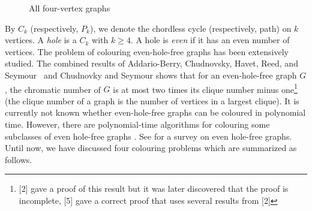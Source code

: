 \documentclass[12pt]{article}
\begin{document}
\begin{figure}
\begin{center}
		\end{center}
		\caption{All four-vertex graphs}\label{fig:4vertex-graphs}
	\end{figure}
	
	By $C_k$ (respectively, $P_k$), we denote the chordless cycle (respectively, path) on $k$ vertices. A {\it hole} is a $C_k$ with $k \geq 4$.  A hole is \emph{even} if it has an even  number of vertices.  The problem of colouring even-hole-free graphs has been extensively studied. 
	The combined results of Addario-Berry, Chudnovsky, Havet, Reed, and Seymour~\cite{addarioBerryEtAl:ehf} and Chudnovky and Seymour \cite{ChuSey2023}
	shows that for an even-hole-free graph $G$, the chromatic number of $G$ is at most two times its clique number minus one\footnote{[2] gave a proof of this result but it was later discovered that the proof is incomplete, [5] gave a correct proof that uses several results from [2]} (the clique number of a graph is the number of vertices in a largest clique). 
	It is currently not known whether even-hole-free graphs can be coloured in polynomial time. 
	However, there are polynomial-time algorithms for colouring some subclasses of even hole-free graphs  \cite{FraHam2018,CamCha2018,CamDas2018,maffray2019coloring}. See \cite{KloVus2009} for a survey on even hole-free graphs. Until now, we have discussed four colouring problems which are summarized as follows.
	
\end{document}
